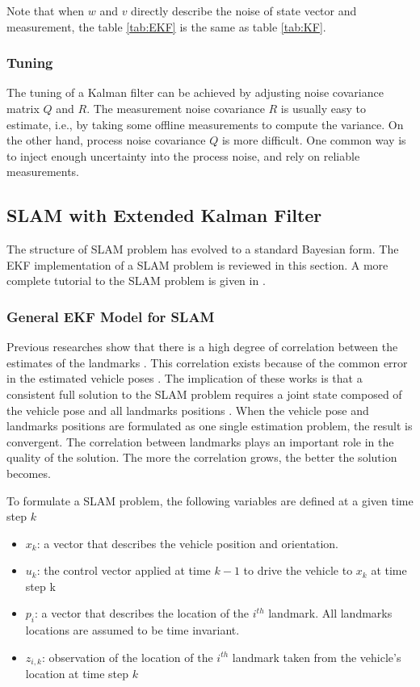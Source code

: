 \noindent Note that when $w$ and $v$ directly describe the noise of
state vector and measurement, the table \ref{tab:EKF} is the same as
table \ref{tab:KF}.

\subsubsection{Tuning}
The tuning of a Kalman filter can be achieved by adjusting noise covariance
matrix $Q$ and $R$. The measurement noise covariance $R$ is usually
easy to estimate, i.e., by taking some offline measurements to compute
the variance. On the other hand, process noise covariance $Q$ is more
difficult. One common way is to inject enough uncertainty into the
process noise, and rely on reliable measurements.
 
\subsection{SLAM with Extended Kalman Filter}
The structure of SLAM problem has evolved to a standard
Bayesian form. The EKF implementation of a SLAM problem is reviewed in
this section. A more complete tutorial to the SLAM problem is given in
\cite{durrant-whyte_simultaneous_2006}
\cite{bailey_simultaneous_2006}.

\subsubsection{General EKF Model for SLAM}
Previous researches show that there is a high degree of correlation
between the estimates of the landmarks
\cite{smith_representation_1986} \cite{durrant-whyte_uncertain_1988}.
This correlation exists because of the common error in the estimated
vehicle poses \cite{leonard_simultaneous_1991}. The implication of
these works is that a consistent full solution to the SLAM problem
requires a joint state composed of the vehicle pose and all landmarks
positions \cite{durrant-whyte_simultaneous_2006}. When the vehicle
pose and landmarks positions are formulated as one single estimation
problem, the result is convergent. The correlation between landmarks
plays an important role in the quality of the solution. The more the
correlation grows, the better the solution becomes.
\cite{durrant-whyte_localization_1996} \cite{csorba_new_1996}
\cite{csorba_simultaneous_1997} \cite{dissanayake_solution_2001}

To formulate a SLAM problem, the following variables are defined at a given time step $k$
\begin{itemize}
  \item $x_k$: a vector that describes the vehicle position and
orientation.
  \item $u_k$: the control vector applied at time $k-1$ to drive the
vehicle to $x_k$ at time step k
  \item $p_i$: a vector that describes the location of the $i^{th}$
landmark. All landmarks locations are assumed to be time invariant.
  \item $z_{i,k}$: observation of the location of the $i^{th}$
landmark taken from the vehicle's location at time step $k$
\end{itemize}

